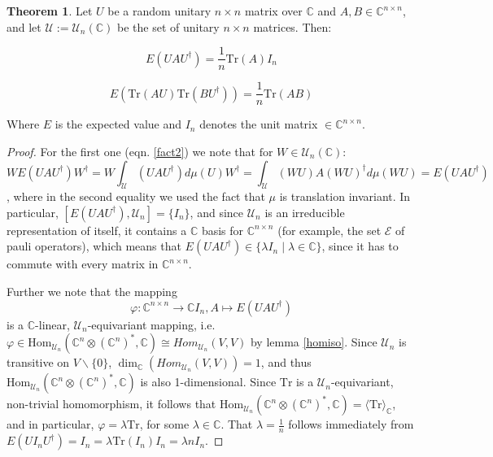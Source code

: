 \documentclass{article}
\def\E{\mathcal{E}}
\def\C{\mathbb{C}}
\def\U{\mathcal{U}}
\def\Hom{\text{Hom}}
\def\Tr{\text{Tr}}
\theoremstyle{definition}
\newtheorem{theorem}[Satz]{Theorem}
\begin{document}
\begin{theorem}
Let $U$ be a random unitary $n \times n$ matrix over $\C$ and $A,B \in \C^{n \times n}$, and let $\U := \U_n(\C)$ be the set of unitary $n \times n$ matrices. Then:

\begin{equation}\label{fact2} %
E(UAU^\dagger) = \frac{1}{n} \Tr(A) I_n
\end{equation}

\begin{equation}\label{fact1}
 E(\Tr(AU)\Tr(BU^\dagger)) = \frac{1}{n} \Tr(AB)
\end{equation}

Where $E$ is the expected value and $I_n$ denotes the unit matrix $\in \C^{n \times n}$.

\begin{proof}

For the first one (eqn. \ref{fact2}) we note that $\text{for }W \in \U_n(\C):$
 \begin{equation}  W E(UAU^{\dagger}) W^\dagger = W \int_{\U} ( U A  U^\dagger) d \mu (U) W^\dagger = \int_{\U} (WU) A (WU)^\dagger d \mu (WU) = E(UAU^\dagger) \end{equation}, where in the second equality we used the fact that $\mu$ is translation invariant.
In particular, $[E(UAU^\dagger), \U_n] = \{ I_n \}$, and since $\U_n$ is an irreducible representation of itself, it contains a $\C$ basis for $\C^{n \times n}$ (for example, the set $\E$ of pauli operators), which means that $E(UAU^\dagger) \in \{ \lambda I_n \mid \lambda \in \C \}$, since it has to commute with every matrix in $\C^{n \times n}$.

Further we note that the mapping \[ \varphi: \C^{n \times n} \rightarrow \C I_n, A \mapsto E(UAU^\dagger) \] is a $\C$-linear, $\U_n$-equivariant mapping, i.e. $\varphi \in \Hom_{\U_n}(\C^n \otimes (\C^n)^*, \C) \cong Hom_{\U_n}(V,V)$ by lemma \ref{homiso}. Since $\U_n$ is transitive on $V \backslash \{ 0 \}$, $\dim_\C (Hom_{\U_n}(V,V)) = 1$, and thus $\Hom_{\U_n}(\C^n \otimes (\C^n)^*, \C)$ is also 1-dimensional.
Since $\Tr$ is a $\U_n$-equivariant, non-trivial homomorphism, it follows that $\Hom_{\U_n}(\C^n \otimes (\C^n)^*, \C) = \langle \Tr \rangle_\C$, and in particular, $\varphi = \lambda \Tr$, for some $\lambda \in \C$. That $\lambda = \frac 1 n$ follows immediately from $E(U I_n U^\dagger) = I_n = \lambda \Tr(I_n) I_n = \lambda n I_n$.


\end{proof}
\end{theorem}
\end{document}
